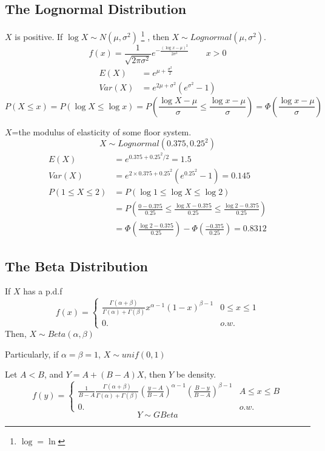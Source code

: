 \subsection{The Lognormal Distribution}
$X$ is positive. If $\log{X} \sim N(\mu,\sigma^2)$ \footnote{$\log=\ln$} , then $X \sim Lognormal(\mu,\sigma^2)$.
\[f(x)=\frac{1}{\sqrt{2 \pi \sigma^2}} e^{-\frac{(\log{x}-\mu)^2}{2 \sigma^2}}   \qquad  x>0\]
\begin{align*}
E(X)&=e^{\mu +\frac{\sigma^2}{2}} \\
Var(X)&=e^{2\mu +\sigma^2} (e^{\sigma^2}-1)
\end{align*}
\[P(X \leq x)=P(\log{X}\leq \log{x})= P \left(\frac{\log{X}-\mu}{\sigma} \leq \frac{\log{x}-\mu}{\sigma} \right)  =\Phi \left(\frac{\log{x}-\mu}{\sigma} \right)\]

\begin{exmp}
$X$=the modulus of elasticity of some floor system.
\[X \sim Lognormal(0.375,0.25^2)\]
\begin{align*}
E(X)&=e^{0.375+0.25^{2}/2}=1.5\\
Var(X)&= e^{2\times0.375+0.25^{2}}\left(e^{0.25^{2}}-1\right)=0.145\\
P(1 \leq X \leq 2)&=P(\log{1} \leq \log{X}\leq \log{2})\\
&= P \left(\frac{0-0.375}{0.25} \leq \frac{\log{X}-0.375}{0.25} \leq \frac{\log{2}-0.375}{0.25} \right) \\
& =\Phi \left(\frac{\log{2}-0.375}{0.25} \right)-\Phi \left(\frac{-0.375}{0.25} \right)=\boxed{0.8312}
\end{align*}


\end{exmp}

\subsection{The Beta Distribution}
If $X$ has a p.d.f 
\[f(x)=\begin{cases}
\frac{\Gamma(\alpha+\beta)}{\Gamma(\alpha)+\Gamma(\beta)}x^{\alpha-1}(1-x)^{\beta-1}  & 0 \leq x \leq 1 \\
0. & o.w.
\end{cases}\]
Then, $X \sim Beta(\alpha,\beta)$

\begin{prop}
Particularly, if $\alpha=\beta=1$, $X \sim unif(0,1)$
\end{prop}

\begin{prop}
Let $A < B$, and $Y=A+(B-A)X$, then $Y$ be density.
\[f(y)=\begin{cases}
\frac{1}{B-A}\frac{\Gamma(\alpha+\beta)}{\Gamma(\alpha)+\Gamma(\beta)}\left(\frac{y-A}{B-A}\right)^{\alpha-1}\left(\frac{B-y}{B-A}\right)^{\beta-1}  & A \leq x \leq B \\
0. & o.w.
\end{cases}\]
\[Y \sim GBeta\]
\end{prop}

